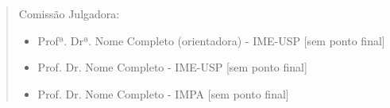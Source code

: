 {\begin{flushright}
		\vskip 2cm
		
	\end{flushright}
	\vskip 4.2cm
	
	\begin{quote}
		\noindent Comissão Julgadora:
		
		\begin{itemize}
			\item Profª. Drª. Nome Completo (orientadora) - IME-USP [sem ponto final]
			\item Prof. Dr. Nome Completo - IME-USP [sem ponto final]
			\item Prof. Dr. Nome Completo - IMPA [sem ponto final]
		\end{itemize}
		
	\end{quote}
}


\pagebreak

